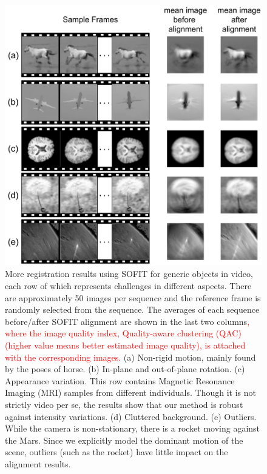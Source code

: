 \documentclass[10pt,journal]{IEEEtran}
\newcommand{\Songfan}[1]{\textcolor{red}{#1}}
\begin{document}
\begin{figure}[htbp]
	\centering
		\includegraphics[width=.65\textwidth]{fig/object_ex}
	\caption{More registration results using SOFIT for generic objects in video, each row of which represents challenges in different aspects. There are approximately 50 images per sequence and the reference frame is randomly selected from the sequence. The averages of each sequence before/after SOFIT alignment are shown in the last two columns\Songfan{, where the image quality index, Quality-aware clustering (QAC)~\cite{Xue_CVPR13} (higher value means better estimated image quality), is attached with the corresponding images.} (a) Non-rigid motion, mainly found by the poses of horse. (b) In-plane and out-of-plane rotation. (c) Appearance variation. This row contains Magnetic Resonance Imaging (MRI) samples from different individuals. Though it is not strictly video per se, the results show that our method is robust against intensity variations. (d) Cluttered background. (e) Outliers. While the camera is non-stationary, there is a rocket moving against the Mars. Since we explicitly model the dominant motion of the scene, outliers (such as the rocket) have little impact on the alignment results.}
	\label{fig:object_ex}
\end{figure}
\end{document}
